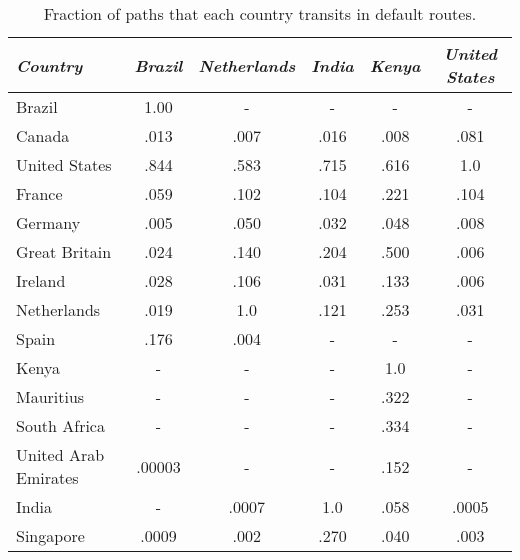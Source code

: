 \begin{table*}[t]
\centering
\begin{tabular}{|P{37mm}|c|c|c|c|c|}
\hline
\textit{Country}    & \textit{Brazil}  & \textit{Netherlands}   & \textit{India} & \textit{Kenya} & \textit{United States}\\
\hline\hline
Brazil              &1.00       & -   & -     & -     & -\\\hline\hline
Canada                &.013       &.007     &.016       &.008      &.081 \\\hline
United States        &.844        &.583     &.715      &.616       &1.0 \\\hline\hline
France                 &.059     &.102      &.104       &.221      &.104 \\\hline
Germany                 &.005       &.050    &.032      &.048      &.008 \\\hline
Great Britain                &.024       &.140     &.204      &.500      &.006 \\\hline
Ireland                &.028       &.106      &.031     &.133      &.006 \\\hline
Netherlands                 &.019        &1.0      &.121      &.253      &.031 \\\hline
Spain                  &.176       &.004     & -     & -      &- \\\hline\hline
Kenya                 & -       &-    & -      &1.0      &- \\\hline
Mauritius                  & -       & -     & -      &.322       &- \\\hline
South Africa                 &-        & -    & -     &.334       &- \\\hline\hline
United Arab Emirates                  &.00003        & -    & -     &.152       &- \\\hline
India               &  -    &.0007    &1.0     &.058     &.0005 \\\hline
Singapore                 &.0009        &.002     &.270       &.040       &.003 \\\hline
\end{tabular}
\caption{Fraction of paths that each country transits in default routes.}
\label{tab:transit}
\end{table*}

